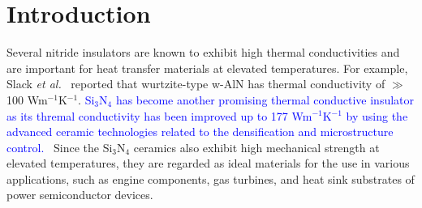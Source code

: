 \documentclass[twocolumn,amsmath,amssymb,a4paper,prb,superscriptaddress,floatfix]{revtex4-1}
\begin{document}
\maketitle

\section{Introduction}
Several nitride insulators are known to exhibit high thermal conductivities and
are important for heat transfer materials at elevated temperatures. For
example, Slack {\it et al.}~\cite{slack} reported that wurtzite-type w-AlN has
thermal conductivity of $\gg$  100 Wm$^{-1}$K$^{-1}$. \textcolor{blue}{Si$_3$N$_4$ has become
another promising thermal conductive insulator as its thremal conductivity has
been improved up to 177 Wm$^{-1}$K$^{-1}$ by using the advanced ceramic
technologies related to the densification and microstructure
control.~\cite{zhou,hirao-rev,watari,hirosaki}} Since the Si$_3$N$_4$ ceramics also
exhibit high mechanical strength at elevated temperatures, they are
regarded as ideal materials for the use in various applications, such as
engine components, gas turbines, and heat sink substrates of power
semiconductor devices.
\end{document}
